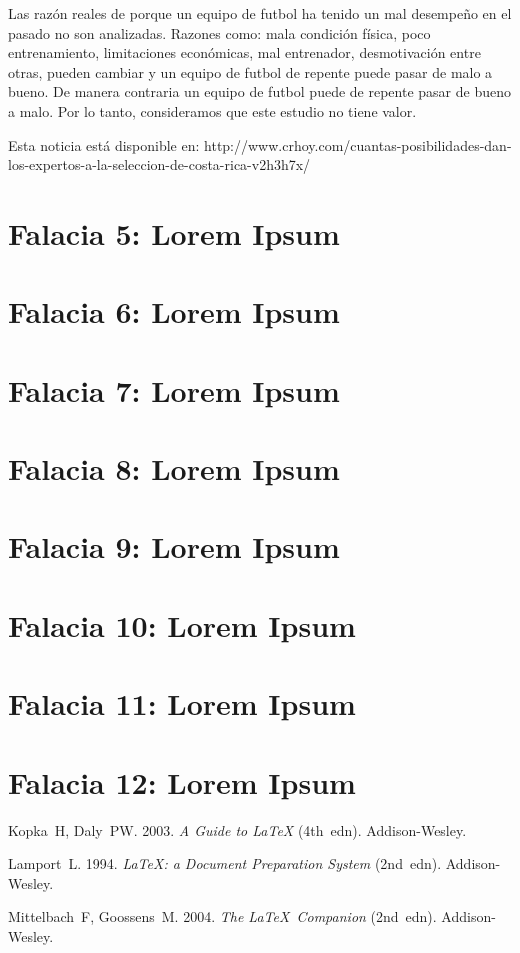 \documentclass[times]{simauth}
\begin{document}
Las razón reales de porque un equipo de futbol ha tenido un mal desempeño en el pasado no son analizadas. Razones como: mala condición física, poco entrenamiento, limitaciones económicas, mal entrenador, desmotivación entre otras,  pueden cambiar y un equipo de futbol de repente puede pasar de malo a bueno. De manera contraria un equipo de futbol puede de repente pasar de bueno a malo. Por lo tanto, consideramos que este estudio no tiene valor. 

Esta noticia está disponible en: http://www.crhoy.com/cuantas-posibilidades-dan-los-expertos-a-la-seleccion-de-costa-rica-v2h3h7x/

\newpage
\section{Falacia 5: Lorem Ipsum}

\section{Falacia 6: Lorem Ipsum}

\section{Falacia 7: Lorem Ipsum}

\section{Falacia 8: Lorem Ipsum}

\section{Falacia 9: Lorem Ipsum}

\section{Falacia 10: Lorem Ipsum}

\section{Falacia 11: Lorem Ipsum}

\section{Falacia 12: Lorem Ipsum}


\begin{thebibliography}{9}

 Kopka~H, Daly~PW. 2003. \emph{A Guide to \LaTeX} (4th~edn).
Addison-Wesley.

 Lamport~L. 1994. \emph{\LaTeX: a Document Preparation System} (2nd~edn).
Addison-Wesley.

 Mittelbach~F, Goossens~M. 2004. \emph{The \LaTeX\ Companion}
(2nd~edn). Addison-Wesley.
\end{thebibliography}
\end{document}
